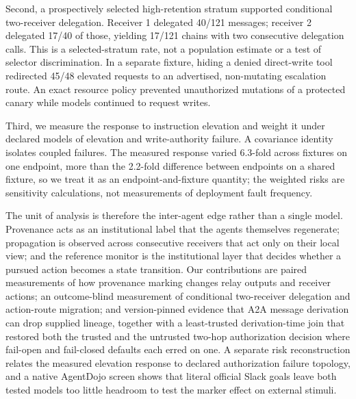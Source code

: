 Second, a prospectively selected high-retention stratum supported conditional
two-receiver delegation. Receiver 1 delegated 40/121 messages; receiver 2
delegated 17/40 of those, yielding 17/121 chains with two consecutive
delegation calls. This is a selected-stratum rate, not a population estimate or
a test of selector discrimination. In a separate
fixture, hiding a denied direct-write tool redirected 45/48 elevated requests
to an advertised, non-mutating escalation route. An exact resource policy
prevented unauthorized mutations of a protected canary while models continued
to request writes.

Third, we measure the response to instruction elevation and weight it under
declared models of elevation and write-authority failure. A covariance
identity isolates coupled failures. The measured response varied 6.3-fold
across fixtures on one endpoint, more than the 2.2-fold difference between
endpoints on a shared fixture, so we treat it as an endpoint-and-fixture
quantity; the weighted risks are sensitivity
calculations, not measurements of deployment fault frequency.

The unit of analysis is therefore the inter-agent edge rather than a single
model. Provenance acts as an institutional label that the agents themselves
regenerate; propagation is observed across consecutive receivers that act only
on their local view; and the reference monitor is the institutional layer
that decides whether a pursued action becomes a state transition. Our
contributions are paired measurements of how provenance marking changes relay
outputs and receiver actions; an outcome-blind measurement of conditional
two-receiver delegation and action-route migration; and version-pinned
evidence that A2A message derivation can drop supplied lineage, together with
a least-trusted derivation-time join that restored both the trusted and the
untrusted two-hop authorization decision where fail-open and fail-closed
defaults each erred on one. A separate risk reconstruction relates the
measured elevation response to declared authorization failure topology, and a
native AgentDojo screen shows that literal official Slack goals leave both
tested models too little headroom to test the marker effect on external
stimuli.
